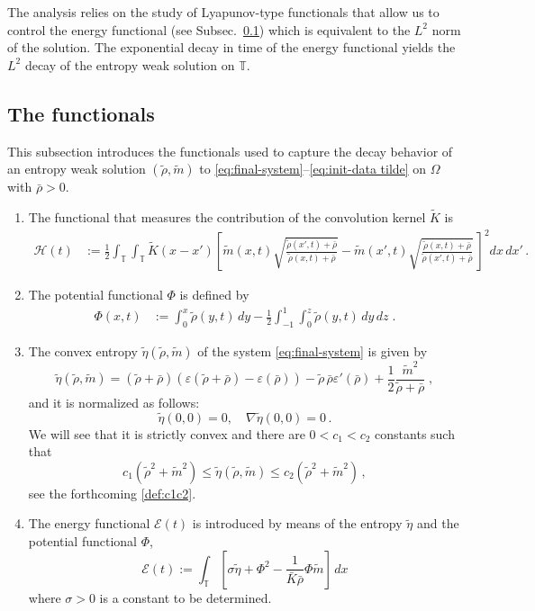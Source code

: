 \documentclass[10pt,reqno]{amsart}
\newcommand{\bbt} {\mathbb T}
\newcommand{\eps}{\varepsilon}
\begin{document}
The analysis relies on the study of Lyapunov-type functionals that allow us to control the energy functional %
(see Subsec.~\ref{sec:2.1}) which is equivalent to the $L^2$ norm of the solution. 
The exponential decay in time of the energy functional yields the $L^2$ decay of the entropy weak solution on $\bbt$.


\subsection{The functionals}\label{sec:2.1}
This subsection introduces the functionals used to capture the decay behavior of an entropy weak solution $(\tilde\rho,\tilde m)$ 
to \eqref{eq:final-system}–\eqref{eq:init-data tilde} on $\Omega$ with $\bar\rho>0$.

\begin{enumerate}
\item The functional that measures the contribution of the convolution kernel $\tilde K$ is 
\begin{align}
    \mathcal{H}(t) & := \frac{1}{2}\int_\bbt\int_\bbt \tilde K(x-x')\left[\tilde m(x,t)\sqrt{\frac{\tilde\rho(x',t)+\bar\rho}{\tilde\rho(x,t)+\bar\rho}}-\tilde m(x',t)\sqrt{\frac{\tilde\rho(x,t)+\bar\rho}{\tilde\rho(x',t)+\bar\rho}} \,\right]^2dx\,dx'\,.\label{def:H-function}
    \end{align}
 \item The potential functional $\Phi$ is defined by
    \begin{align}
    \Phi(x,t)  & := \int_0^x \tilde\rho(y,t)\,dy - \frac{1}{2}\int_{-1}^1\int_0^z \tilde\rho(y,t)\,dy\,dz\;.\label{def:Phi-function}
    \end{align}
\item The convex entropy $\tilde\eta(\tilde\rho,\tilde m)$ of the system \eqref{eq:final-system} is given by
\begin{equation}\label{def:entropy}
    \tilde\eta(\tilde\rho,\tilde m)= (\tilde\rho+\bar\rho)(\eps(\tilde\rho+\bar\rho)-\eps(\bar\rho))-\tilde\rho\,\bar\rho\eps'(\bar\rho)+\frac{1}{2}\frac{\tilde m^2}{\tilde\rho+\bar\rho}\;,
\end{equation}
and it is normalized as follows:
\begin{equation*}
            \tilde\eta(0,0)=0,\quad \nabla\tilde\eta(0,0)=0\,.
        \end{equation*}
        We will see that it is strictly convex and there are $0<c_1<c_2$ constants such that
        \begin{equation*}
         c_1(\tilde\rho^2+\tilde m^2)\leq \tilde\eta(\tilde\rho,\tilde m)\leq c_2(\tilde \rho^2+\tilde m^2)\,,
        \end{equation*}
see the forthcoming \eqref{def:c1c2}.
\item The energy functional $\mathcal{E}(t)$ is introduced by means of the 
entropy $\tilde\eta$ and the potential functional $\Phi$,
    \begin{equation} \label{def:energy-function}
    \mathcal{E}(t) := \int_\bbt \left[ \sigma\tilde\eta + \Phi^2 - \frac{1}{\bar K\bar\rho}\Phi \tilde m \right]\,dx 
    \end{equation}
where $\sigma>0$ is a constant to be determined. 


\end{enumerate}
\end{document}
